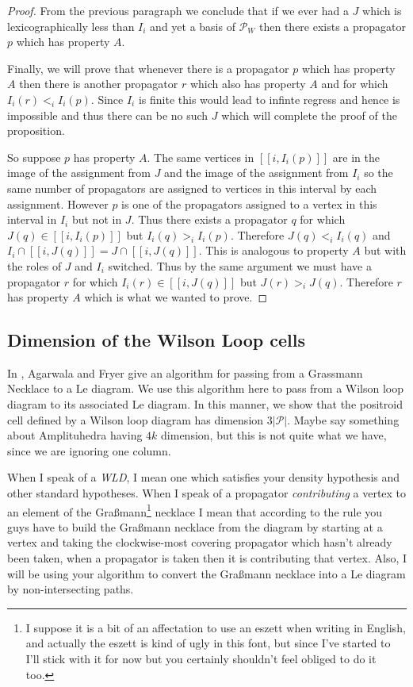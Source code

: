 \documentclass[11pt]{article}
\newcommand{\cP}{\mathcal{P}}
\newcommand{\PP}{\mathcal{P}}
\newcommand{\interval}[2]{[\![#1,#2]\!]}
\theoremstyle{remark}
\theoremstyle{definition}
\begin{document}
\begin{proof}
{}From the previous paragraph we conclude that if we ever had a $J$ which is lexicographically less than $I_i$ and yet a basis of $\PP_W$ then there exists a propagator $p$ which has property $A$.

Finally, we will prove that whenever there is a propagator $p$ which has property $A$ then there is another propagator $r$ which also has property $A$ and for which $I_i(r) <_i I_i(p)$.  Since $I_i$ is finite this would lead to infinte regress and hence is impossible and thus there can be no such $J$ which will complete the proof of the proposition.

So suppose $p$ has property $A$.  The same vertices in $\interval{i}{I_i(p)}$ are in the image of the assignment from $J$ and the image of the assignment from $I_i$ so the same number of propagators are assigned to vertices in this interval by each assignment.  However $p$ is one of the propagators assigned to a vertex in this interval in $I_i$ but not in $J$.  Thus there exists a propagator $q$ for which $J(q)\in \interval{i}{I_i(p)}$ but $I_i(q) >_i I_i(p)$.  Therefore $J(q)<_i I_i(q)$ and  $I_i\cap \interval{i}{J(q)} = J\cap \interval{i}{J(q)}$.  This is analogous to property $A$ but with the roles of $J$ and $I_i$ switched.  Thus by the same argument we must have a propagator $r$ for which $I_i(r)\in \interval{i}{J(q)}$ but $J(r)>_i J(q)$.  Therefore $r$ has property $A$ which is what we wanted to prove.

\end{proof}

\subsection{Dimension of the Wilson Loop cells}

In \cite{reversingOh}, Agarwala and Fryer give an algorithm for passing from a Grassmann Necklace to a Le diagram. We use this algorithm here to pass from a Wilson loop diagram to its associated Le diagram. In this manner, we show that the positroid cell defined by a Wilson loop diagram has dimension $3|\cP|$. Maybe say something about Amplituhedra having $4k$ dimension, but this is not quite what we have, since we are ignoring one column.

When I speak of a \emph{WLD}, I mean one which satisfies your density hypothesis and other standard hypotheses.  When I speak of a propagator \emph{contributing} a vertex to an element of the Gra\ss mann\footnote{I suppose it is a bit of an affectation to use an eszett when writing in English, and actually the eszett is kind of ugly in this font, but since I've started to I'll stick with it for now but you certainly shouldn't feel obliged to do it too.} necklace I mean that according to the rule you guys have to build the Gra\ss mann necklace from the diagram by starting at a vertex and taking the clockwise-most covering propagator which hasn't already been taken, when a propagator is taken then it is contributing that vertex.  Also, I will be using your algorithm to convert the Gra\ss mann necklace into a Le diagram by non-intersecting paths.
\end{document}
